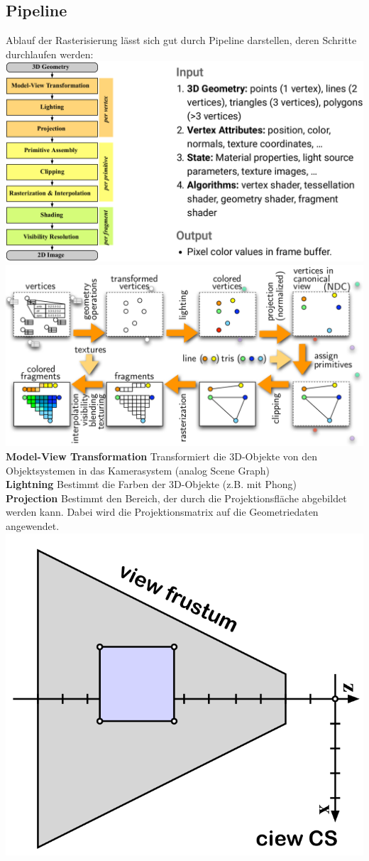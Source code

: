 \documentclass[12pt]{article}
\begin{document}
	\subsection{Pipeline}
	Ablauf der Rasterisierung lässt sich gut durch Pipeline darstellen, deren Schritte durchlaufen werden:\\
	\includegraphics[width=\linewidth]{figures/rasterization-pipeline.png}\\
	\includegraphics[width=\linewidth]{figures/rasterization-pipeline2.png}\\
	\textbf{Model-View Transformation} Transformiert die 3D-Objekte von den Objektsystemen in das Kamerasystem (analog Scene Graph)\\
	\textbf{Lightning} Bestimmt die Farben der 3D-Objekte (z.B. mit Phong)\\
	\textbf{Projection} Bestimmt den Bereich, der durch die Projektionsfläche abgebildet werden kann. Dabei wird die Projektionsmatrix auf die Geometriedaten angewendet.\\
	\includegraphics[width=0.5\linewidth]{figures/rasterization-projection1.png}
\end{document}
